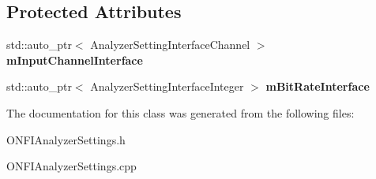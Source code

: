 \subsection*{Protected Attributes}
\begin{DoxyCompactItemize}
\item 
\mbox{\label{classONFIAnalyzerSettings_a8d84341646e53473bce7625aef716e42}} 
std\+::auto\+\_\+ptr$<$ Analyzer\+Setting\+Interface\+Channel $>$ {\bfseries m\+Input\+Channel\+Interface}
\item 
\mbox{\label{classONFIAnalyzerSettings_a9efaf0afb39461ccb0bb1288d82b5169}} 
std\+::auto\+\_\+ptr$<$ Analyzer\+Setting\+Interface\+Integer $>$ {\bfseries m\+Bit\+Rate\+Interface}
\end{DoxyCompactItemize}


The documentation for this class was generated from the following files\+:\begin{DoxyCompactItemize}
\item 
O\+N\+F\+I\+Analyzer\+Settings.\+h\item 
O\+N\+F\+I\+Analyzer\+Settings.\+cpp\end{DoxyCompactItemize}

